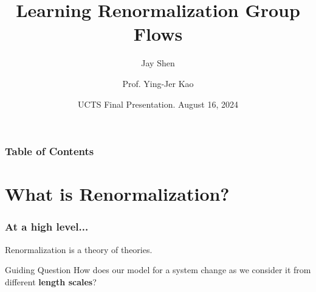 \documentclass[aspectratio=169, 12pt]{beamer}
\title{Learning Renormalization Group Flows}
\author[Jay Shen]{ 
    Jay Shen
    \and
    Prof. Ying-Jer Kao
}
\date[August 16, 2024] {
    UCTS Final Presentation. August 16, 2024
}
\begin{document}
\frame{\titlepage}


%
%


    

\begin{frame}
    \frametitle{Table of Contents}
    \tableofcontents
\end{frame}

\section{What is Renormalization?}

\begin{frame}
    \frametitle{At a high level...}

    Renormalization is a theory of theories. 

    \begin{alertblock}{Guiding Question}
        How does our model for a system change as we consider it from different \textbf{length scales}?
    \end{alertblock}

\end{frame}
\end{document}
